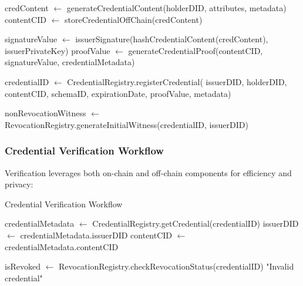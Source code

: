 \documentclass[lettersize,journal]{IEEEtran}
\begin{document}
\begin{itemize}
\begin{algorithm}[H]
\begin{algorithmic}[1]
\State {}
\State credContent $\gets$ generateCredentialContent(holderDID, attributes, metadata)
\State contentCID $\gets$ storeCredentialOffChain(credContent) 

\State {}
\State signatureValue $\gets$ issuerSignature(hashCredentialContent(credContent), issuerPrivateKey)
\State proofValue $\gets$ generateCredentialProof(contentCID, signatureValue, credentialMetadata)

\State {}
\State credentialID $\gets$ CredentialRegistry.registerCredential(
\hspace{\algorithmicindent}issuerDID, 
\hspace{\algorithmicindent}holderDID, 
\hspace{\algorithmicindent}contentCID, 
\hspace{\algorithmicindent}schemaID, 
\hspace{\algorithmicindent}expirationDate,
\hspace{\algorithmicindent}proofValue,
\hspace{\algorithmicindent}metadata)

\State {}
\State nonRevocationWitness $\gets$ RevocationRegistry.generateInitialWitness(credentialID, issuerDID)
\end{algorithmic}
\end{algorithm}

\subsubsection{Credential Verification Workflow}
Verification leverages both on-chain and off-chain components for efficiency and privacy:

\begin{algorithm}[H]
\caption{Credential Verification Workflow}
\begin{algorithmic}[1]
\State {}
\State credentialMetadata $\gets$ CredentialRegistry.getCredential(credentialID)
\State issuerDID $\gets$ credentialMetadata.issuerDID
\State contentCID $\gets$ credentialMetadata.contentCID

\State {}
\State isRevoked $\gets$ RevocationRegistry.checkRevocationStatus(credentialID)
\RETURN "Invalid credential"
\EndIf


\end{algorithmic}
\end{algorithm}
\end{itemize}
\end{document}
